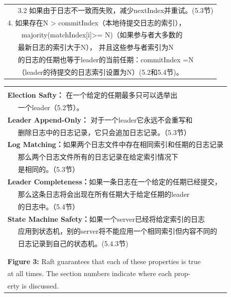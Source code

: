 \documentclass[journal]{IEEEtran}
\begin{document}
\begin{table}[htp]
\begin{center}
\begin{tabular}{|p{8.4cm}|}
\ \ \ 3.2 如果由于日志不一致而失败，减少nextIndex并重试。(5.3节) \\
4. 如果存在N > commitIndex（本地待提交日志的索引），\\
\ \ \ \ majority(matchIndex[i]>= N)（如果参与者大多数的\\
\ \ \ 最新日志的索引大于N）， 并且这些参与者索引为N \\
\ \ \ 的日志的任期也等于leader的当前任期：commitIndex =N\\
\ \ \ （leader的待提交的日志索引设置为N）(5.2和5.4节)。\\
\hline
\end{tabular}
\end{center}
\label{default}
\end{table}%

\begin{table}[htp]
\begin{center}
\begin{tabular}{|p{8.4cm}|}
\hline
\\
\textbf{Election Safty：} 在一个给定的任期最多只可以选举出\\
\ \ \ 一个leader（5.2节）。\\
\textbf{Leader Append-Only：} 对于一个leader它永远不会重写和 \\ 
\ \ \ 删除日志中的日志记录，它只会追加日志记录。（5.3节）\\
\textbf{Log Matching：}如果两个日志文件中存在相同索引和任期的日志记录\\
\ \ \ 那么两个日志文件所有的日志记录在给定索引情况下\\
\ \ \ 是相同的。（5.3节）\\
\textbf{Leader Completeness：}如果一条日志在一个给定的任期已经提交，\\
\ \ \ 那么这条日志将会出现在所有任期大于给定任期的leader\\
\ \ \ 的日志中。（5.4节）\\
\textbf{State Machine Safety：}如果一个server已经将给定索引的日志\\
\ \ \ 应用到状态机，别的server将不能应用一个相同索引但内容不同的\\
\ \ \ 日志记录到自己的状态机。(5.4.3节)\\
\\
\hline
\multicolumn{1}{l}{}\\
\multicolumn{1}{l}{\textbf{Figure 3:} Raft guarantees that each of these properties is true}\\
\multicolumn{1}{l}{\qquad at all times. The section numbers indicate where each prop- }\\
\multicolumn{1}{l}{\qquad erty is discussed.}\\
\end{tabular}
\end{center}
\label{default}
\end{table}%
\end{document}

